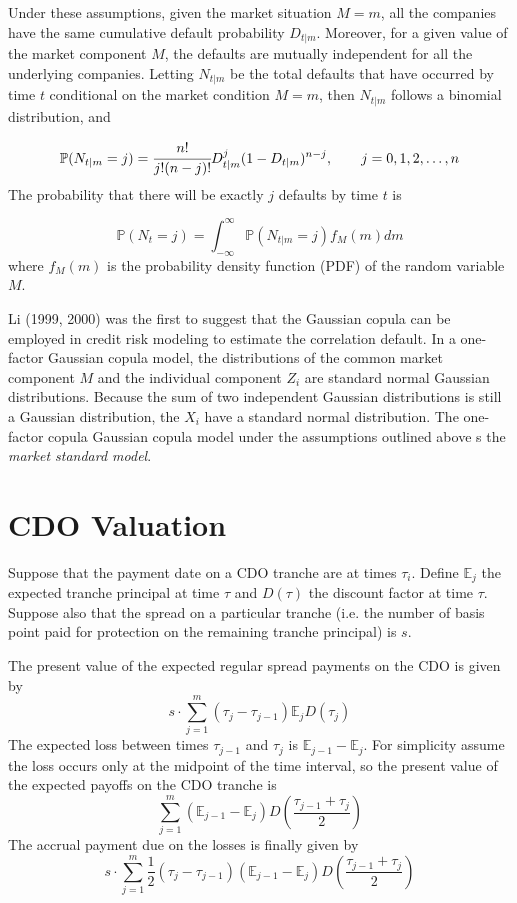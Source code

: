 Under these assumptions, given the market situation $M = m$, all the companies
have the same cumulative default probability $D_{t|m}$. Moreover, for a
given value of the market component $M$, the defaults are mutually independent for
all the underlying companies. Letting $N_{t|m}$ be the total defaults that have occurred
by time $t$ conditional on the market condition $M = m$, then $N_{t|m}$ follows a binomial
distribution, and

\[\mathbb{P}(N_{t|m} = j) = \cfrac{n!}{j!(n-j)!}D^j_{t|m}(1-D_{t|m})^{n-j},\qquad  j=0, 1, 2,\ldots,n\]
The probability that there will be exactly $j$ defaults by time $t$ is

\[\mathbb{P}(N_{t} = j) = \int_{-\infty}^{\infty}{\mathbb{P}(N_{t|m} = j)f_M(m)dm}\]
where $f_M(m)$ is the probability density function (PDF) of the random variable $M$.

Li (1999, 2000) was the first to suggest that the Gaussian copula can be employed
in credit risk modeling to estimate the correlation default. In a one-factor Gaussian
copula model, the distributions of the common market component $M$ and the individual component $Z_i$
are standard normal Gaussian distributions.
Because the sum of two independent Gaussian distributions is still a Gaussian distribution, the $X_i$
have a standard normal distribution.
The one-factor copula Gaussian copula model under the assumptions outlined above s the \emph{market standard model}.

\section{CDO Valuation}
Suppose that the payment date on a CDO tranche are at times $\tau_i$. Define $\mathbb{E}_j$ the expected 
tranche principal at time $\tau$ and $D(\tau)$ the discount factor at time $\tau$. Suppose also that the spread
on a particular tranche (i.e. the number of basis point paid for protection on the remaining tranche principal) is $s$. 

The present value of the expected regular spread payments on the CDO is given by
\begin{equation}
s\cdot \sum_{j=1}^{m}(\tau_j - \tau_{j-1})\mathbb{E}_{j}D(\tau_j)
\label{eq:A}
\end{equation}
The expected loss between times $\tau_{j-1}$ and $\tau_j$ is $\mathbb{E}_{j-1}-\mathbb{E}_j$. For simplicity assume
the loss occurs only at the midpoint of the time interval, so the present value of the expected payoffs on the CDO tranche is
\begin{equation}
\sum_{j=1}^{m}(\mathbb{E}_{j-1}-\mathbb{E}_j)D\left(\frac{\tau_{j-1}+\tau_j}{2}\right)
\label{eq:C}
\end{equation}
The accrual payment due on the losses is finally given by
\begin{equation}
s\cdot\sum_{j=1}^{m}\frac{1}{2}(\tau_j - \tau_{j-1})(\mathbb{E}_{j-1}-\mathbb{E}_j)D(\frac{\tau_{j-1}+\tau_j}{2})
\label{eq:B}
\end{equation}

